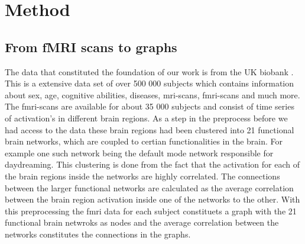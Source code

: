 \chapter{Method}

\section{From fMRI scans to graphs}
The data that constituted the foundation of our work is from the UK biobank \cite{}. This is a extensive data set of over 500 000 subjects which contains information about sex, age, cognitive abilities, diseases, mri-scans, fmri-scans and much more. The fmri-scans are available for about 35 000 subjects and consist of time series of activation's in different brain regions. As a step in the preprocess before we had access to the data these brain regions had been clustered into 21 functional brain networks, which are coupled to certian functionalities in the brain. For example one such network being the default mode network responsible for daydreaming. This clustering is done from the fact that the activation for each of the brain regions inside the networks are highly correlated. The connections between the larger functional networks are calculated as the average correlation between the brain region activation inside one of the networks to the other. With this preprocessing the fmri data for each subject constituets a graph with the 21 functional brain netwroks as nodes and the average correlation between the networks constitutes the connections in the graphs. 

